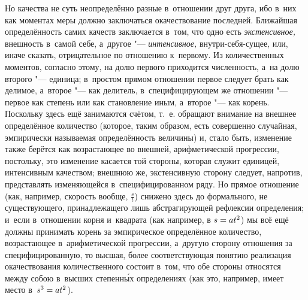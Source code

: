 Но качества не суть неопределённо разные в~отношении друг друга, ибо в~них как
моментах меры должно заключаться окачествование последней. Ближайшая
определённость самих качеств заключается в~том, что одно есть
{\em экстенсивное,} внешность в~самой себе, а~другое "--- {\em интенсивное,}
внутри-себя-сущее, или, иначе сказать, отрицательное по отношению к~первому. Из
количественных моментов, согласно этому, на долю первого приходится численность,
а~на долю второго "--- единица; в~простом прямом отношении первое следует
брать как делимое, а~второе "--- как делитель, в~специфицирующем же отношении
"--- первое как степень или как становление иным, а~второе "--- как корень.
Поскольку здесь ещё занимаются счётом, т.~е. обращают внимание на внешнее
определённое количество (которое, таким образом, есть совершенно случайная,
эмпирически называемая определённость величины) и, стало быть, изменение также
берётся как возрастающее во внешней, арифметической прогрессии, постольку,
это изменение касается той стороны, которая служит единицей, интенсивным
качеством; внешнюю же, экстенсивную сторону следует, напротив, представлять
изменяющейся в~специфицированном ряду. Но прямое отношение (как, например,
скорость вообще, $\frac s t$) снижено здесь до формального, не существующего,
принадлежащего лишь абстрагирующей рефлексии определения; и~если в~отношении
корня и~квадрата (как например, в $s\hm=at^2$) мы всё ещё должны принимать
корень за эмпирическое определённое количество, возрастающее в~арифметической
прогрессии, а~другую сторону отношения за специфицированную, то высшая, более
соответствующая понятию реализация окачествования количественного состоит
в~том, что обе стороны относятся между собою в~высших степенн\'{ы}х
определениях (как это, например, имеет место в~$s^3\hm=at^2$).

\subsubsection[Примечание]{}

